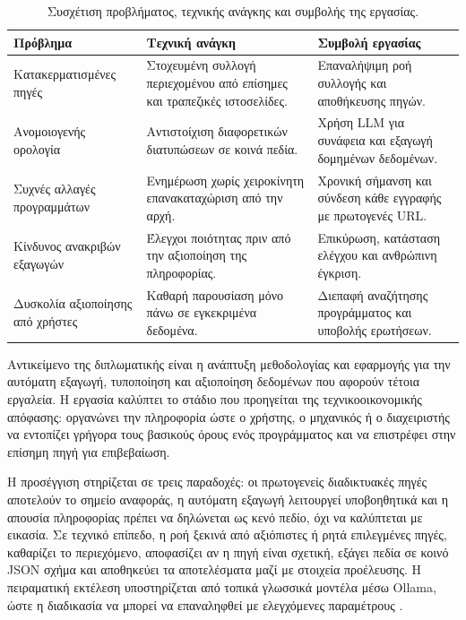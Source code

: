 \begin{table}[!htbp]
    \centering
    \caption[Πρόβλημα, τεχνική ανάγκη και συμβολή της εργασίας]{Συσχέτιση προβλήματος, τεχνικής ανάγκης και συμβολής της εργασίας.}
    \label{tab:problem-contribution}
    \begingroup
    \small
    \renewcommand{\arraystretch}{1.15}
    \begin{tabularx}{\textwidth}{L{3.2cm}Y Y}
        \toprule
        \textbf{Πρόβλημα} & \textbf{Τεχνική ανάγκη} & \textbf{Συμβολή εργασίας} \\
        \midrule
        Κατακερματισμένες πηγές & Στοχευμένη συλλογή περιεχομένου από επίσημες και τραπεζικές ιστοσελίδες. & Επαναλήψιμη ροή συλλογής και αποθήκευσης πηγών. \\
        Ανομοιογενής ορολογία & Αντιστοίχιση διαφορετικών διατυπώσεων σε κοινά πεδία. & Χρήση LLM για συνάφεια και εξαγωγή δομημένων δεδομένων. \\
        Συχνές αλλαγές προγραμμάτων & Ενημέρωση χωρίς χειροκίνητη επανακαταχώριση από την αρχή. & Χρονική σήμανση και σύνδεση κάθε εγγραφής με πρωτογενές URL. \\
        Κίνδυνος ανακριβών εξαγωγών & Έλεγχοι ποιότητας πριν από την αξιοποίηση της πληροφορίας. & Επικύρωση, κατάσταση ελέγχου και ανθρώπινη έγκριση. \\
        Δυσκολία αξιοποίησης από χρήστες & Καθαρή παρουσίαση μόνο πάνω σε εγκεκριμένα δεδομένα. & Διεπαφή αναζήτησης προγράμματος και υποβολής ερωτήσεων. \\
        \bottomrule
    \end{tabularx}
    \endgroup
\end{table}

Αντικείμενο της διπλωματικής είναι η ανάπτυξη μεθοδολογίας και εφαρμογής για
την αυτόματη εξαγωγή, τυποποίηση και αξιοποίηση δεδομένων που αφορούν τέτοια
εργαλεία. Η εργασία καλύπτει το στάδιο που προηγείται της τεχνικοοικονομικής
απόφασης: οργανώνει την πληροφορία ώστε ο χρήστης, ο μηχανικός ή ο
διαχειριστής να εντοπίζει γρήγορα τους βασικούς όρους ενός προγράμματος και να
επιστρέφει στην επίσημη πηγή για επιβεβαίωση.

Η προσέγγιση στηρίζεται σε τρεις παραδοχές: οι πρωτογενείς διαδικτυακές πηγές
αποτελούν το σημείο αναφοράς, η αυτόματη εξαγωγή λειτουργεί υποβοηθητικά και
η απουσία πληροφορίας πρέπει να δηλώνεται ως κενό πεδίο, όχι να καλύπτεται με
εικασία. Σε τεχνικό επίπεδο, η ροή ξεκινά από αξιόπιστες ή ρητά επιλεγμένες
πηγές, καθαρίζει το περιεχόμενο, αποφασίζει αν η πηγή είναι σχετική, εξάγει
πεδία σε κοινό JSON σχήμα και αποθηκεύει τα αποτελέσματα μαζί με στοιχεία
προέλευσης. Η πειραματική εκτέλεση υποστηρίζεται από τοπικά γλωσσικά μοντέλα
μέσω Ollama, ώστε η διαδικασία να μπορεί να επαναληφθεί με ελεγχόμενες
παραμέτρους \cite{ollama_docs_2026}.

